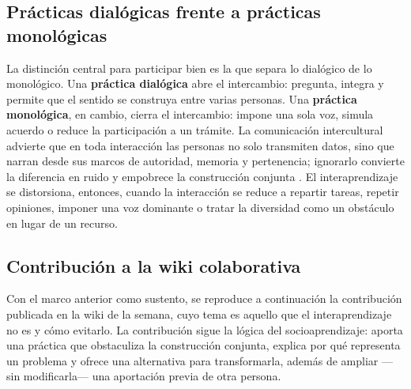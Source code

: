 \documentclass[
  spanish,
  letterpaper, oneside
]{article}
\begin{document}
\subsection{Prácticas dialógicas frente a prácticas monológicas}

La distinción central para participar bien es la que separa lo dialógico de lo
monológico. Una \textbf{práctica dialógica} abre el intercambio: pregunta, integra y
permite que el sentido se construya entre varias personas. Una \textbf{práctica
monológica}, en cambio, cierra el intercambio: impone una sola voz, simula acuerdo o
reduce la participación a un trámite. La comunicación intercultural advierte que en
toda interacción las personas no solo transmiten datos, sino que narran desde sus
marcos de autoridad, memoria y pertenencia; ignorarlo convierte la diferencia en
ruido y empobrece la construcción conjunta \citep{pech2016manual}. El interaprendizaje
se distorsiona, entonces, cuando la interacción se reduce a repartir tareas, repetir
opiniones, imponer una voz dominante o tratar la diversidad como un obstáculo en lugar
de un recurso.

\subsection{Contribución a la wiki colaborativa}

Con el marco anterior como sustento, se reproduce a continuación la contribución
publicada en la wiki de la semana, cuyo tema es aquello que el interaprendizaje no es
y cómo evitarlo. La contribución sigue la lógica del socioaprendizaje: aporta una
práctica que obstaculiza la construcción conjunta, explica por qué representa un
problema y ofrece una alternativa para transformarla, además de ampliar —sin
modificarla— una aportación previa de otra persona.
\end{document}
